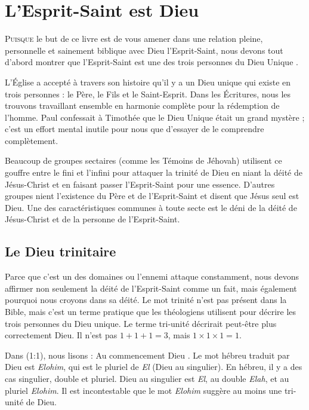 \chapter{L'Esprit-Saint est Dieu}

\lettrine[lines=3]{P}{uisque} le but de ce livre est de vous amener dans une relation pleine, personnelle et sainement biblique avec Dieu l'Esprit-Saint, nous devons tout d'abord montrer que l'Esprit-Saint est une des trois personnes du Dieu Unique .

L'Église a accepté à travers son histoire qu'il y a un Dieu unique qui existe en trois personnes : le Père, le Fils et le Saint-Esprit. Dans les Écritures, nous les trouvons travaillant ensemble en harmonie complète pour la rédemption de l'homme. Paul confessait à Timothée que le Dieu Unique était un grand mystère ; c'est un effort mental inutile pour nous que d'essayer de le comprendre complètement.

Beaucoup de groupes sectaires (comme les Témoins de Jéhovah) utilisent ce gouffre entre le fini et l'infini pour attaquer la trinité de Dieu en niant la déité de Jésus-Christ et en faisant passer l'Esprit-Saint pour une essence. D'autres groupes nient l'existence du Père et de l'Esprit-Saint et disent que Jésus seul est Dieu. Une des caractéristiques communes à toute secte est le déni de la déité de Jésus-Christ et de la personne de l'Esprit-Saint.

\section{Le Dieu trinitaire}

Parce que c'est un des domaines ou l'ennemi attaque constamment, nous devons affirmer non seulement la déité de l'Esprit-Saint comme un fait, mais également pourquoi nous croyons dans sa déité. Le mot \og trinité \fg{} n'est pas présent dans la Bible, mais c'est un terme pratique que les théologiens utilisent pour décrire les trois personnes du Dieu unique. Le terme \og tri-unité \fg{} décrirait peut-être plus correctement Dieu. Il n'est pas $1 + 1 + 1 = 3$, mais $1 \times 1 \times 1 = 1$.

Dans (1:1), nous lisons : \og Au commencement Dieu \fg{}. Le mot hébreu traduit par \og Dieu \fg{} est \emph{Elohim}, qui est le pluriel de \emph{El} (Dieu au singulier). En hébreu, il y a des cas singulier, double et pluriel. \og Dieu \fg{} au singulier est \emph{El}, au double \emph{Elah}, et au pluriel \emph{Elohim}. Il est incontestable que le mot \emph{Elohim} suggère au moins une tri-unité de Dieu.

